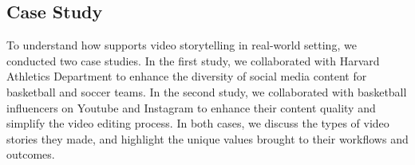 








\subsection{Case Study}
To understand how \SB{} supports video storytelling in real-world setting, we conducted two case studies. In the first study, we collaborated with Harvard Athletics Department to enhance the diversity of social media content for basketball and soccer teams. In the second study, we collaborated with basketball influencers on Youtube and Instagram to enhance their content quality and simplify the video editing process. In both cases, we discuss the types of video stories they made, and highlight the unique values \SB{} brought to their workflows and outcomes. 


